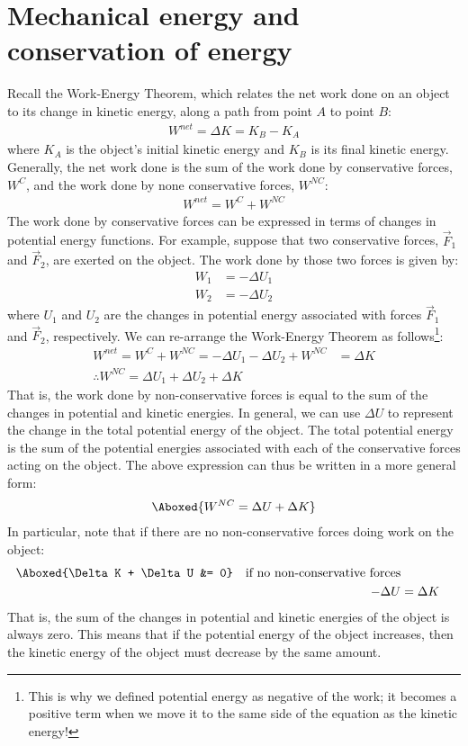 \section{Mechanical energy and conservation of energy}
Recall the Work-Energy Theorem, which relates the net work done on an object to its change in kinetic energy, along a path from point $A$ to point $B$:
\begin{align*}
W^{net}=\Delta K = K_B - K_A
\end{align*}
where $K_A$ is the object's initial kinetic energy and $K_B$ is its final kinetic energy. Generally, the net work done is the sum of the work done by conservative forces, $W^C$, and the work done by none conservative forces, $W^{NC}$:
\begin{align*}
W^{net}=W^C+W^{NC}
\end{align*}
The work done by conservative forces can be expressed in terms of changes in potential energy functions. For example, suppose that two conservative forces, $\vec F_1$ and $\vec F_2$, are exerted on the object. The work done by those two forces is given by:
\begin{align*}
W_1 &= -\Delta U_1\\
W_2 &= -\Delta U_2
\end{align*}
where $U_1$ and $U_2$ are the changes in potential energy associated with forces $\vec F_1$ and $\vec F_2$, respectively. We can re-arrange the Work-Energy Theorem as follows\footnote{This is why we defined potential energy as negative of the work; it becomes a positive term when we move it to the same side of the equation as the kinetic energy!}:
\begin{align*}
W^{net}=W^C+W^{NC}=-\Delta U_1 - \Delta U_2 +W^{NC} &= \Delta K\\
\therefore W^{NC} = \Delta U_1 + \Delta U_2 + \Delta K
\end{align*}
That is, the work done by non-conservative forces is equal to the sum of the changes in potential and kinetic energies. In general, we can use $\Delta U$ to represent the change in the total potential energy of the object. The total potential energy is the sum of the potential energies associated with each of the conservative forces acting on the object. The above expression can thus be written in a more general form:
\begin{align}
\Aboxed{W^{NC}=\Delta U + \Delta K}
\end{align}
In particular, note that if there are no non-conservative forces doing work on the object:
\begin{align}
\Aboxed{\Delta K + \Delta U &= 0}\quad\text{if no non-conservative forces}\\
-\Delta U &= \Delta K \nonumber
\end{align}
That is, the sum of the changes in potential and kinetic energies of the object is always zero. This means that if the potential energy of the object increases, then the kinetic energy of the object must decrease by the same amount.

